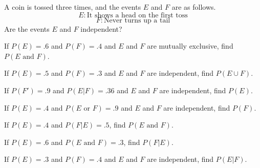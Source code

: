 \begin{puzzle}
    A coin is tossed three times, and the events \( E \) and \( F \) are as follows.
    \[ E: \text{It shows a head on the first toss} \]
    \[ F: \text{Never turns up a tail} \]
    Are the events \( E \) and \( F \) independent?
\end{puzzle}

\begin{puzzle}
    If \( P(E) = .6 \) and \( P(F) = .4 \) and \( E \) and \( F \) are mutually exclusive, find \( P(E \text{ and } F) \).
\end{puzzle}

\begin{puzzle}
    If \( P(E) = .5 \) and \( P(F) = .3 \) and \( E \) and \( F \) are independent, find \( P(E \cup F) \).
\end{puzzle}

\begin{puzzle}
    If \( P(F') = .9 \) and \( P(E | F) = .36 \) and \( E \) and \( F \) are independent, find \( P(E) \).
\end{puzzle}

\begin{puzzle}
    If \( P(E) = .4 \) and \( P(E \text{ or } F) = .9 \) and \( E \) and \( F \) are independent, find \( P(F) \).
\end{puzzle}

\begin{puzzle}
    If \( P(E) = .4 \) and \( P(F | E) = .5 \), find \( P(E \text{ and } F) \).
\end{puzzle}

\begin{puzzle}
    If \( P(E) = .6 \) and \( P(E \text{ and } F) = .3 \), find \( P(F | E) \).
\end{puzzle}

\begin{puzzle}
    If \( P(E) = .3 \) and \( P(F) = .4 \) and \( E \) and \( F \) are independent, find \( P(E | F) \).
\end{puzzle}
